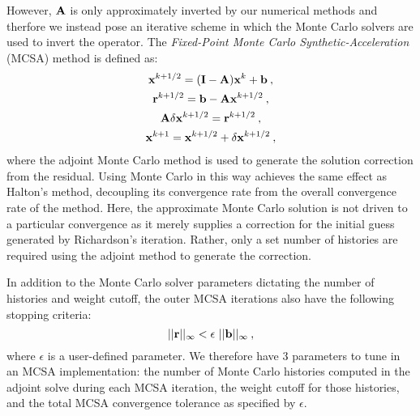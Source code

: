 However, $\mathbf{A}$ is only approximately inverted by our numerical
methods and therfore we instead pose an iterative scheme in which the
Monte Carlo solvers are used to invert the operator. The
\textit{Fixed-Point Monte Carlo Synthetic-Acceleration} (MCSA) method
is defined as:
\begin{subequations}
  \begin{gather}
    \mathbf{x}^{k+1/2} = (\mathbf{I} - \mathbf{A})\mathbf{x}^k + \mathbf{b}\:,\\
    \mathbf{r}^{k+1/2} = \mathbf{b} - \mathbf{A}\mathbf{x}^{k+1/2}\:,\\
    \mathbf{A}\delta\mathbf{x}^{k+1/2} = \mathbf{r}^{k+1/2}\:,\\
    \mathbf{x}^{k+1} = \mathbf{x}^{k+1/2} + \delta \mathbf{x}^{k+1/2}\:,
    \label{eq:mcsa}
  \end{gather}
\end{subequations}
where the adjoint Monte Carlo method is used to generate the solution
correction from the residual. Using Monte Carlo in this way achieves
the same effect as Halton's method, decoupling its convergence rate
from the overall convergence rate of the method. Here, the approximate
Monte Carlo solution is not driven to a particular convergence as it
merely supplies a correction for the initial guess generated by
Richardson's iteration. Rather, only a set number of histories are
required using the adjoint method to generate the correction.

In addition to the Monte Carlo solver parameters dictating the number
of histories and weight cutoff, the outer MCSA iterations also have
the following stopping criteria:
\begin{equation}
  ||\ve{r}||_\infty < \epsilon \ ||\ve{b}||_\infty\:,
  \label{eq:mcsa_stopping_criteria}
\end{equation}
where $\epsilon$ is a user-defined parameter. We therefore have 3
parameters to tune in an MCSA implementation: the number of Monte
Carlo histories computed in the adjoint solve during each MCSA
iteration, the weight cutoff for those histories, and the total MCSA
convergence tolerance as specified by $\epsilon$.

